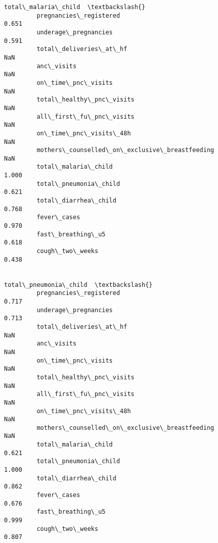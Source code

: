\documentclass[11pt]{article}
\begin{document}
\begin{Verbatim}[commandchars=\\\{\}]
                                                        total\_malaria\_child  \textbackslash{}
         pregnancies\_registered                                       0.651   
         underage\_pregnancies                                         0.591   
         total\_deliveries\_at\_hf                                         NaN   
         anc\_visits                                                     NaN   
         on\_time\_pnc\_visits                                             NaN   
         total\_healthy\_pnc\_visits                                       NaN   
         all\_first\_fu\_pnc\_visits                                        NaN   
         on\_time\_pnc\_visits\_48h                                         NaN   
         mothers\_counselled\_on\_exclusive\_breastfeeding                  NaN   
         total\_malaria\_child                                          1.000   
         total\_pneumonia\_child                                        0.621   
         total\_diarrhea\_child                                         0.768   
         fever\_cases                                                  0.970   
         fast\_breathing\_u5                                            0.618   
         cough\_two\_weeks                                              0.438   
         
                                                        total\_pneumonia\_child  \textbackslash{}
         pregnancies\_registered                                         0.717   
         underage\_pregnancies                                           0.713   
         total\_deliveries\_at\_hf                                           NaN   
         anc\_visits                                                       NaN   
         on\_time\_pnc\_visits                                               NaN   
         total\_healthy\_pnc\_visits                                         NaN   
         all\_first\_fu\_pnc\_visits                                          NaN   
         on\_time\_pnc\_visits\_48h                                           NaN   
         mothers\_counselled\_on\_exclusive\_breastfeeding                    NaN   
         total\_malaria\_child                                            0.621   
         total\_pneumonia\_child                                          1.000   
         total\_diarrhea\_child                                           0.862   
         fever\_cases                                                    0.676   
         fast\_breathing\_u5                                              0.999   
         cough\_two\_weeks                                                0.807   
         

\end{Verbatim}
\end{document}
